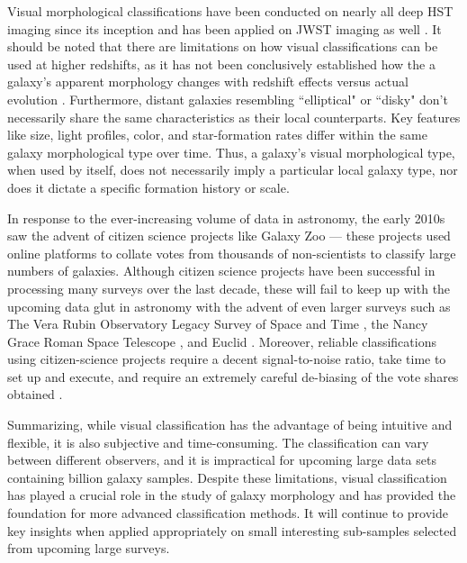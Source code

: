 Visual morphological classifications have been conducted on nearly all deep HST imaging since its inception \citep[e.g.,][]{vdb_96, lee_13, kartaltepe_15} and has been applied on JWST imaging as well \citep[e.g.,][]{kartaltepe_23}. It should be noted that there are limitations on how visual classifications can be used at higher redshifts, as it has not been conclusively established how the a galaxy's apparent morphology changes with redshift effects versus actual evolution \citep{morph_review}. Furthermore, distant galaxies resembling ``elliptical" or ``disky" don't necessarily share the same characteristics as their local counterparts. Key features like size, light profiles, color, and star-formation rates differ within the same galaxy morphological type over time. Thus, a galaxy's visual morphological type, when used by itself, does not necessarily imply a particular local galaxy type, nor does it dictate a specific formation history or scale.

In response to the ever-increasing volume of data in astronomy, the early 2010s saw the advent of citizen science projects like Galaxy Zoo \citep{gzoo_original} --- these projects used online platforms to collate votes from thousands of non-scientists to classify large numbers of galaxies. Although citizen science projects have been successful in processing many surveys over the last decade, these will fail to keep up with the upcoming data glut in astronomy with the advent of even larger surveys such as The Vera Rubin Observatory Legacy Survey of Space and Time \citep[LSST;][]{lsst}, the Nancy Grace Roman Space Telescope \citep[NGRST;][]{ngrst}, and Euclid \citep{euclid}. Moreover, reliable  classifications using citizen-science projects require a decent signal-to-noise ratio, take time to set up and execute, and require an extremely careful de-biasing of the vote shares obtained \citep[e.g.,][]{gzoo_original,gzoo_candels}. 

Summarizing, while visual classification has the advantage of being intuitive and flexible, it is also subjective and time-consuming. The classification can vary between different observers, and it is impractical for upcoming large data sets containing billion galaxy samples. Despite these limitations, visual classification has played a crucial role in the study of galaxy morphology and has provided the foundation for more advanced classification methods. It will continue to provide key insights when applied appropriately on small interesting sub-samples selected from upcoming large surveys. 

